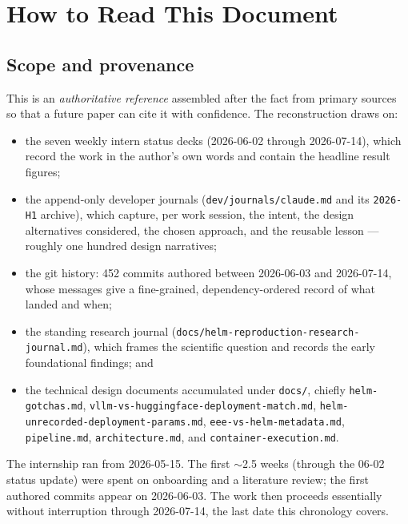\documentclass[11pt]{report}
\newcommand{\file}[1]{\texttt{#1}}
\begin{document}
\chapter{How to Read This Document}

\section{Scope and provenance}

This is an \emph{authoritative reference} assembled after the fact from primary
sources so that a future paper can cite it with confidence. The reconstruction
draws on:

\begin{itemize}[nosep]
  \item the seven weekly intern status decks (2026-06-02 through 2026-07-14),
        which record the work in the author's own words and contain the headline
        result figures;
  \item the append-only developer journals (\file{dev/journals/claude.md} and its
        \file{2026-H1} archive), which capture, per work session, the intent, the
        design alternatives considered, the chosen approach, and the reusable
        lesson --- roughly one hundred design narratives;
  \item the git history: 452 commits authored between 2026-06-03 and 2026-07-14,
        whose messages give a fine-grained, dependency-ordered record of what
        landed and when;
  \item the standing research journal
        (\file{docs/helm-reproduction-research-journal.md}), which frames the
        scientific question and records the early foundational findings; and
  \item the technical design documents accumulated under \file{docs/}, chiefly
        \file{helm-gotchas.md}, \file{vllm-vs-huggingface-deployment-match.md},
        \file{helm-unrecorded-deployment-params.md}, \file{eee-vs-helm-metadata.md},
        \file{pipeline.md}, \file{architecture.md}, and
        \file{container-execution.md}.
\end{itemize}

The internship ran from 2026-05-15. The first $\sim$2.5 weeks (through the 06-02
status update) were spent on onboarding and a literature review; the first
authored commits appear on 2026-06-03. The work then proceeds essentially without
interruption through 2026-07-14, the last date this chronology covers.
\end{document}
